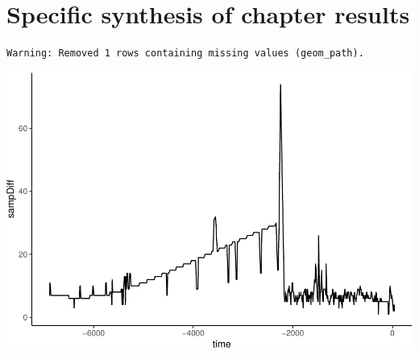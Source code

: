 \documentclass[12pt,twoside,openany]{reedthesis}
\begin{document}
\section{Specific synthesis of chapter
results}\label{specific-synthesis-of-chapter-results}
\begin{verbatim}
Warning: Removed 1 rows containing missing values (geom_path).
\end{verbatim}
\includegraphics{_myDissertation_files/figure-latex/unnamed-chunk-9-1.pdf}
\end{document}

